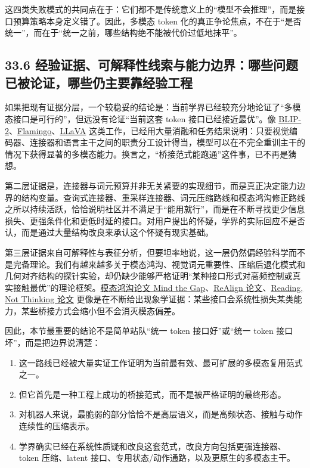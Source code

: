 这四类失败模式的共同点在于：它们都不是传统意义上的“模型不会推理”，而是接口预算策略本身定义错了。因此，多模态 token 化的真正争论焦点，不在于“是否统一”，而在于“统一之前，哪些结构绝不能被代价过低地抹平”。

\subsection*{33.6 经验证据、可解释性线索与能力边界：哪些问题已被论证，哪些仍主要靠经验工程}


如果把现有证据分层，一个较稳妥的结论是：当前学界已经较充分地论证了“多模态接口是可行的”，但远没有论证“当前这套 token 接口已经接近最优”。像 \href{https://arxiv.org/abs/2301.12597}{BLIP-2}、\href{https://arxiv.org/abs/2204.14198}{Flamingo}、\href{https://arxiv.org/abs/2304.08485}{LLaVA} 这类工作，已经用大量消融和任务结果说明：只要视觉编码器、连接器和语言主干之间的职责分工设计得当，模型可以在不完全重训主干的情况下获得显著的多模态能力。换言之，“桥接范式能跑通”这件事，已不再是猜想。

第二层证据是，连接器与词元预算并非无关紧要的实现细节，而是真正决定能力边界的结构变量。查询式连接器、重采样连接器、词元压缩路线和模态鸿沟修正路线之所以持续活跃，恰恰说明社区并不满足于“能用就行”，而是在不断寻找更少信息损失、更强条件化和更低时延的接口。对用户提出的怀疑，学界的实际回应不是否认，而是通过大量结构改良来承认这个怀疑有现实基础。

第三层证据来自可解释性与表征分析，但要坦率地说，这一层仍然偏经验科学而不是完备理论。我们有越来越多关于模态鸿沟、视觉词元重要性、压缩后退化模式和几何对齐结构的探针实验，却仍缺少能够严格证明“某种接口形式对高频控制或真实接触最优”的理论框架。\href{https://arxiv.org/abs/2203.02053}{模态鸿沟论文 Mind the Gap}、\href{https://arxiv.org/abs/2602.07026}{ReAlign 论文}、\href{https://arxiv.org/abs/2603.09095}{Reading, Not Thinking 论文} 更像是在不断给出现象学证据：某些接口会系统性损失某类能力，某些桥接方式会缩小但不会消灭模态偏差。

因此，本节最重要的结论不是简单站队“统一 token 接口好”或“统一 token 接口坏”，而是把边界说清楚：

\begin{enumerate}
\item 这一路线已经被大量实证工作证明为当前最有效、最可扩展的多模态复用范式之一。
\item 但它首先是一种工程上成功的桥接范式，而不是被严格证明的最终形态。
\item 对机器人来说，最脆弱的部分恰恰不是高层语义，而是高频状态、接触与动作连续性的压缩表示。
\item 学界确实已经在系统性质疑和改良这套范式，改良方向包括更强连接器、token 压缩、latent 接口、专用状态/动作通路，以及更原生的多模态主干。
\end{enumerate}

